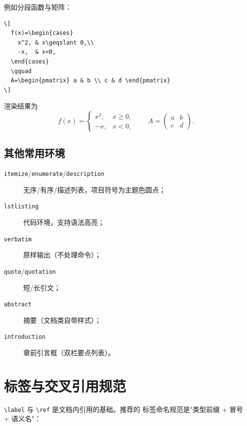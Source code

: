 例如分段函数与矩阵：

\begin{lstlisting}
\[
  f(x)=\begin{cases}
    x^2, & x\geqslant 0,\\
    -x,  & x<0,
  \end{cases}
  \qquad
  A=\begin{pmatrix} a & b \\ c & d \end{pmatrix}
\]
\end{lstlisting}

渲染结果为
\[
  f(x)=\begin{cases}
    x^2, & x\geqslant 0,\\
    -x,  & x<0,
  \end{cases}
  \qquad
  A=\begin{pmatrix} a & b \\ c & d \end{pmatrix}.
\]

\subsection{其他常用环境}

\begin{description}
  \item[\texttt{itemize}/\texttt{enumerate}/\texttt{description}]
        无序/有序/描述列表，项目符号为主题色圆点；
  \item[\texttt{lstlisting}] 代码环境，支持语法高亮；
  \item[\texttt{verbatim}] 原样输出（不处理命令）；
  \item[\texttt{quote}/\texttt{quotation}] 短/长引文；
  \item[\texttt{abstract}] 摘要（文档类自带样式）；
  \item[\texttt{introduction}] 章前引言框（双栏要点列表）。
\end{description}

\section{标签与交叉引用规范}

\verb|\label| 与 \verb|\ref| 是文档内引用的基础。推荐的
标签命名规范是"类型前缀 + 冒号 + 语义名"：

